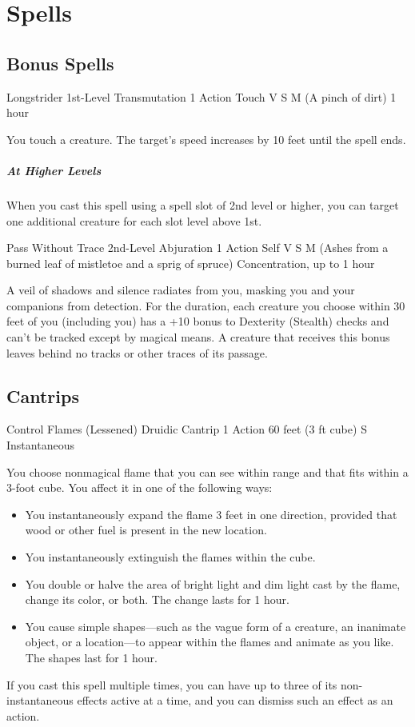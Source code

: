\documentclass[letterpaper,openany,oneside,twocolumn]{book}
\begin{document}
\section*{Spells}

\subsection*{Bonus Spells}

\DndSpellHeader
  {Longstrider}
  {1st-Level Transmutation}
  {1 Action}
  {Touch}
  {V S M (A pinch of dirt)}
  {1 hour}

You touch a creature. The target's speed increases by 10 feet until the spell ends.

\subparagraph*{At Higher Levels} When you cast this spell using a spell slot of 2nd level or higher, you can target one additional creature for each slot level above 1st.

\DndSpellHeader
  {Pass Without Trace}
  {2nd-Level Abjuration}
  {1 Action}
  {Self}
  {V S M (Ashes from a burned leaf of mistletoe and a sprig of spruce)}
  {Concentration, up to 1 hour}

A veil of shadows and silence radiates from you, masking you and your companions from detection. For the duration, each creature you choose within 30 feet of you (including you) has a +10 bonus to Dexterity (Stealth) checks and can't be tracked except by magical means. A creature that receives this bonus leaves behind no tracks or other traces of its passage.

\subsection*{Cantrips}

\DndSpellHeader
  {Control Flames (Lessened)}
  {Druidic Cantrip}
  {1 Action}
  {60 feet (3 ft cube)}
  {S}
  {Instantaneous}

You choose nonmagical flame that you can see within range and that fits within a 3-foot cube. You affect it in one of the following ways:
\begin{itemize}
	\item You instantaneously expand the flame 3 feet in one direction, provided that wood or other fuel is present in the new location.
	\item You instantaneously extinguish the flames within the cube.
	\item You double or halve the area of bright light and dim light cast by the flame, change its color, or both. The change lasts for 1 hour.
	\item You cause simple shapes—such as the vague form of a creature, an inanimate object, or a location—to appear within the flames and animate as you like. The shapes last for 1 hour.
\end{itemize}
If you cast this spell multiple times, you can have up to three of its non-instantaneous effects active at a time, and you can dismiss such an effect as an action.
\end{document}
